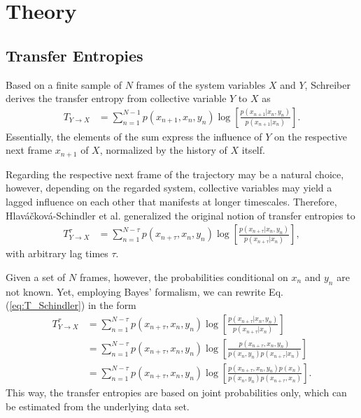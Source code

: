 \documentclass[12pt,a4paper,twoside,english,fleqn,preprint,aps,prb]{revtex4}
\begin{document}
\section{Theory} \subsection{Transfer Entropies} Based on a finite sample of
$N$ frames of the system variables $X$ and $Y$, Schreiber\cite{Schreiber2000}
derives the transfer entropy from collective variable $Y$ to $X$ as
\begin{align} T_{Y \rightarrow X} &= \sum_{n=1}^{N-1} p(x_{n+1}, x_n, y_n) \log
\left[\frac{p(x_{n+1} \vert x_n, y_n) }{ p(x_{n+1} \vert x_n)}
\right]\label{eq:T_Schreiber}.  \end{align} Essentially, the elements of the
sum express the influence of $Y$ on the respective next frame $x_{n+1}$ of $X$,
normalized by the history of $X$ itself.

Regarding the respective next frame of the trajectory may be a natural choice,
however, depending on the regarded system, collective variables may yield a
lagged influence on each other that manifests at longer timescales.  Therefore,
Hlaváčková-Schindler et al.\cite{Schindler2007} generalized the original notion
of transfer entropies to \begin{align} T_{Y \rightarrow X}^{\tau} &=
\sum_{n=1}^{N-\tau} p(x_{n+\tau}, x_n, y_n) \log \left[\frac{p(x_{n+\tau} \vert
x_n, y_n) }{ p(x_{n+\tau} \vert x_n)} \right]\label{eq:T_Schindler},
\end{align} with arbitrary lag times $\tau$.

Given a set of $N$ frames, however, the probabilities conditional on $x_n$ and
$y_n$ are not known.  Yet, employing Bayes' formalism, we can rewrite Eq.
(\ref{eq:T_Schindler}) in the form \begin{align} T_{Y \rightarrow X}^{\tau} &=
\sum_{n=1}^{N-\tau} p(x_{n+\tau}, x_n, y_n) \log \left[\frac{p(x_{n+\tau} \vert
x_n, y_n) }{ p(x_{n+\tau} \vert x_n)} \right]\nonumber\\ &= \sum_{n=1}^{N-\tau}
    p(x_{n+\tau}, x_n, y_n) \log \left[\frac{p(x_{n+\tau}, x_n, y_n)}{p(x_n,
    y_n) p(x_{n+\tau} \vert x_n)} \right]\nonumber\\ &= \sum_{n=1}^{N-\tau}
        p(x_{n+\tau}, x_n, y_n) \log \left[\frac{p(x_{n+\tau}, x_n, y_n)
        p(x_n)}{p(x_n, y_n) p(x_{n+\tau}, x_n)} \right].\label{eq:T}
      \end{align} This way, the transfer entropies are based on joint
      probabilities only, which can be estimated from the underlying data set.
\end{document}
